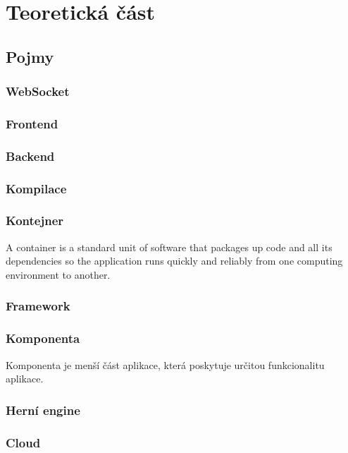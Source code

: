 \chapter{Teoretická část}

\section{Pojmy}

\subsection{WebSocket}

\subsection{Frontend}

\subsection{Backend}

\subsection{Kompilace}

\subsection{Kontejner}
A container is a standard unit of software that packages up code and all its dependencies so the application runs quickly and reliably from one computing environment to another. \cite{Kontejner}

\subsection{Framework}

\subsection{Komponenta}
Komponenta je menší část aplikace, která poskytuje určitou funkcionalitu aplikace.

\subsection{Herní engine}

\subsection{Cloud}

